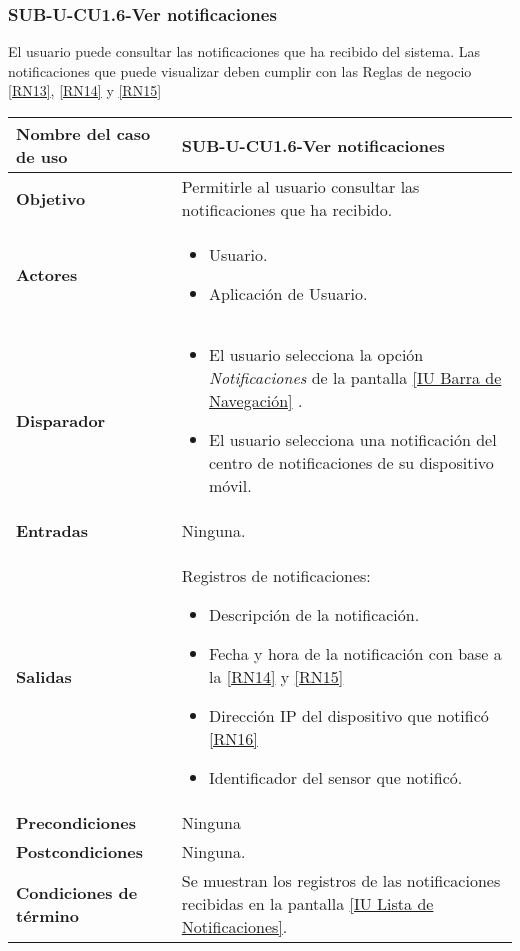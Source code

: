 
\subsubsection{SUB-U-CU1.6-Ver notificaciones}\label{SUB-U-CU1.6}
El usuario puede consultar las notificaciones que ha recibido del sistema. Las notificaciones que puede visualizar deben cumplir con las Reglas de negocio \ref{RN13}, \ref{RN14} y \ref{RN15}

\begin{longtable}{|J{5cm}|J{10.3cm}|}
	\hline
	\textbf{Nombre del caso de uso} &
		SUB-U-CU1.6-Ver notificaciones \\ \hline
	\textbf{Objetivo} &
		Permitirle al usuario consultar las notificaciones que ha recibido. \\ \hline
	\textbf{Actores} &
	    \begin{itemize}
		    \item Usuario. 
		    \item Aplicación de Usuario.
		\end{itemize}
		    \\ \hline 
	\textbf{Disparador} & 
		\begin{itemize}
		    \item El usuario selecciona la opción \textit{Notificaciones} de la pantalla \hyperref[fig:Barra de navegacion]{[IU Barra de Navegación]} .
		    \item El usuario selecciona una notificación del centro de notificaciones de su dispositivo móvil.
		 \end{itemize}
		 \\ \hline 
	\textbf{Entradas} & Ninguna.
		\\ \hline 
	\textbf{Salidas} & 
	    Registros de notificaciones:
		\begin{itemize}
			\item Descripción de la notificación.
			\item Fecha y hora de la notificación con base a la \ref{RN14} y \ref{RN15}
			\item Dirección IP del dispositivo que notificó \ref{RN16}
			\item Identificador del sensor que notificó.
		\end{itemize} 
		\\ \hline
	\textbf{Precondiciones} &
	    Ninguna
		\\ \hline
	\textbf{Postcondiciones} & Ninguna.
		\\ \hline
	\textbf{Condiciones de término} & Se muestran los registros de las notificaciones recibidas en la pantalla \hyperref[fig:Lista de Notificaciones]{[IU Lista de Notificaciones]}.

\end{longtable}
